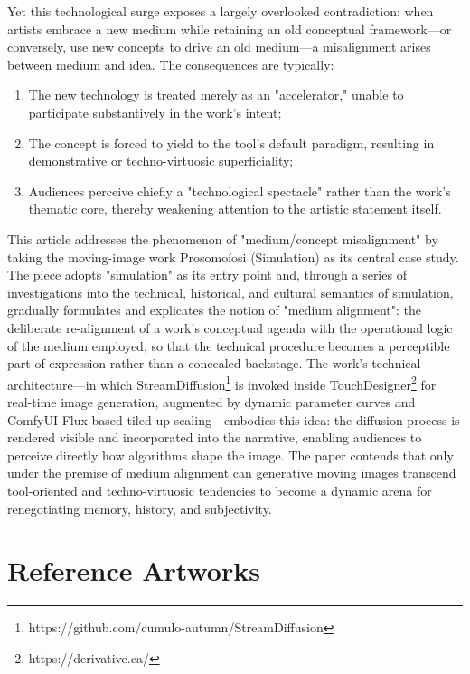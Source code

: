 \documentclass[sigconf,nonacm]{acmart}
\begin{document}
Yet this technological surge exposes a largely overlooked contradiction: when artists embrace a new medium while retaining an old conceptual framework—or conversely, use new concepts to drive an old medium—a misalignment arises between medium and idea. The consequences are typically:  
\begin{enumerate}
    \item The new technology is treated merely as an "accelerator," unable to participate substantively in the work's intent;
    \item The concept is forced to yield to the tool's default paradigm, resulting in demonstrative or techno-virtuosic superficiality;
    \item Audiences perceive chiefly a "technological spectacle" rather than the work's thematic core, thereby weakening attention to the artistic statement itself.
\end{enumerate}

This article addresses the phenomenon of "medium/concept misalignment" by taking the moving-image work Prosomoíosi (Simulation) as its central case study. The piece adopts "simulation" as its entry point and, through a series of investigations into the technical, historical, and cultural semantics of simulation, gradually formulates and explicates the notion of "medium alignment": the deliberate re-alignment of a work's conceptual agenda with the operational logic of the medium employed, so that the technical procedure becomes a perceptible part of expression rather than a concealed backstage. The work's technical architecture—in which StreamDiffusion\footnote{https://github.com/cumulo-autumn/StreamDiffusion} is invoked inside TouchDesigner\footnote{https://derivative.ca/} for real-time image generation, augmented by dynamic parameter curves and ComfyUI Flux-based tiled up-scaling—embodies this idea: the diffusion process is rendered visible and incorporated into the narrative, enabling audiences to perceive directly how algorithms shape the image. The paper contends that only under the premise of medium alignment can generative moving images transcend tool-oriented and techno-virtuosic tendencies to become a dynamic arena for renegotiating memory, history, and subjectivity.

\section{Reference Artworks}
\end{document}
